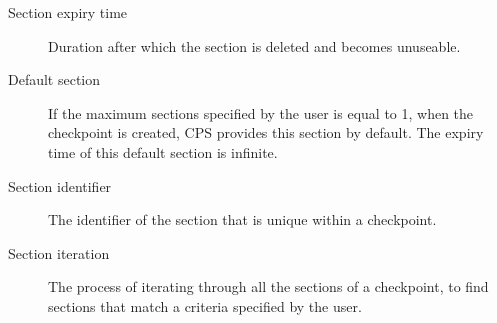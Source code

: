 \begin{flushleft}
\begin{Desc}
\begin{description}
\item[Section expiry time] Duration after which the section is deleted and becomes unuseable.

\end{description}
\begin{description}

\item[Default section] If the maximum sections specified by the user is equal to 1, when the checkpoint is created, CPS provides this section by default.
The expiry time of this default section is infinite.

\end{description}
\begin{description}

\item[Section identifier] The identifier of the section that is unique within a checkpoint.

\end{description}
\begin{description}

\item[Section iteration] The process of iterating through all the sections of a checkpoint, to find sections that match a criteria specified
by the user.

\end{description}
\end{Desc}

\end{flushleft}









